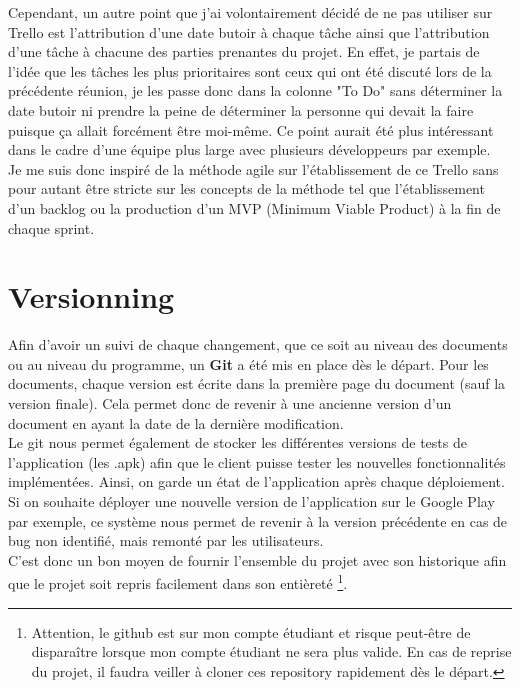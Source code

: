 \documentclass[UTF8]{EPURapport}
\begin{document}
Cependant, un autre point que j'ai volontairement décidé de ne pas utiliser sur Trello est l'attribution d'une date butoir à chaque tâche ainsi que l'attribution d'une tâche à chacune des parties prenantes du projet. En effet, je partais de l'idée que les tâches les plus prioritaires sont ceux qui ont été discuté lors de la précédente réunion, je les passe donc dans la colonne "To Do" sans déterminer la date butoir ni prendre la peine de déterminer la personne qui devait la faire puisque ça allait forcément être moi-même. Ce point aurait été plus intéressant dans le cadre d'une équipe plus large avec plusieurs développeurs par exemple. \\

Je me suis donc inspiré de la méthode agile sur l'établissement de ce Trello sans pour autant être stricte sur les concepts de la méthode tel que l'établissement d'un backlog ou la production d'un MVP (Minimum Viable Product) à la fin de chaque sprint. 

\section{Versionning}

Afin d'avoir un suivi de chaque changement, que ce soit au niveau des documents ou au niveau du programme, un \textbf{Git} a été mis en place dès le départ. Pour les documents, chaque version est écrite dans la première page du document (sauf la version finale). Cela permet donc de revenir à une ancienne version d'un document en ayant la date de la dernière modification.\\

Le git nous permet également de stocker les différentes versions de tests de l'application (les .apk) afin que le client puisse tester les nouvelles fonctionnalités implémentées. Ainsi, on garde un état de l'application après chaque déploiement. Si on souhaite déployer une nouvelle version de l'application sur le Google Play par exemple, ce système nous permet de revenir à la version précédente en cas de bug non identifié, mais remonté par les utilisateurs.\\

C'est donc un bon moyen de fournir l'ensemble du projet avec son historique afin que le projet soit repris facilement dans son entièreté \footnote{Attention, le github est sur mon compte étudiant et risque peut-être de disparaître lorsque mon compte étudiant ne sera plus valide. En cas de reprise du projet, il faudra veiller à cloner ces repository rapidement dès le départ.}.
\end{document}
